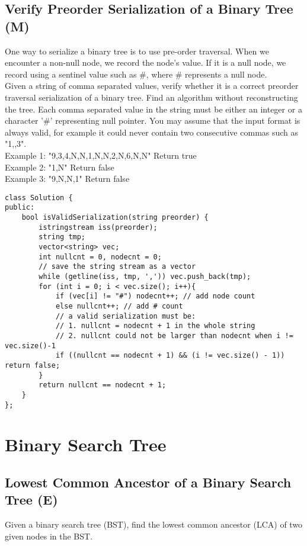 \subsection{Verify Preorder Serialization of a Binary Tree (M)}
One way to serialize a binary tree is to use pre-order traversal. When we encounter a non-null node, we record the node's value. If it is a null node, we record using a sentinel value such as \#, where \# represents a null node. \\

Given a string of comma separated values, verify whether it is a correct preorder traversal serialization of a binary tree. Find an algorithm without reconstructing the tree. Each comma separated value in the string must be either an integer or a character '\#' representing null pointer. You may assume that the input format is always valid, for example it could never contain two consecutive commas such as "1,,3". \\

Example 1:
"9,3,4,N,N,1,N,N,2,N,6,N,N"
Return true\\

Example 2:
"1,N"
Return false\\

Example 3:
"9,N,N,1"
Return false\\

\begin{lstlisting}
class Solution {
public:
    bool isValidSerialization(string preorder) {
        istringstream iss(preorder);
        string tmp;
        vector<string> vec;
        int nullcnt = 0, nodecnt = 0;
        // save the string stream as a vector
        while (getline(iss, tmp, ',')) vec.push_back(tmp); 
        for (int i = 0; i < vec.size(); i++){
            if (vec[i] != "#") nodecnt++; // add node count
            else nullcnt++; // add # count
            // a valid serialization must be:
            // 1. nullcnt = nodecnt + 1 in the whole string
            // 2. nullcnt could not be larger than nodecnt when i != vec.size()-1
            if ((nullcnt == nodecnt + 1) && (i != vec.size() - 1)) return false;
        }
        return nullcnt == nodecnt + 1;
    }
};
\end{lstlisting}


\section{Binary Search Tree}
\subsection{Lowest Common Ancestor of a Binary Search Tree (E)}
Given a binary search tree (BST), find the lowest common ancestor (LCA) of two given nodes in the BST. \\

